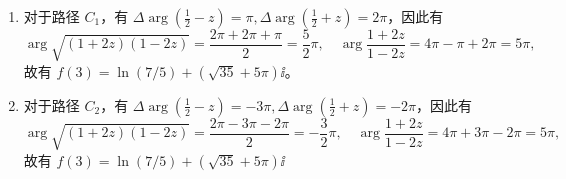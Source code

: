 \begin{question}
\begin{solution}
\begin{enumerate}
  \item 对于路径 \(C_1\)，有 \(\Delta \arg (\frac12-z)=\pi, \Delta \arg(\frac12+z)=2\pi\)，因此有 \[
\arg \sqrt{(1+2z)(1-2z)}=\frac{2\pi +2\pi + \pi}{2}= \frac52 \pi,
\quad \arg\frac{1+2z}{1-2z}=4\pi-\pi+2\pi=5\pi,
\] 故有 \(f(3)=\ln(7/5)+(\sqrt{35} + 5\pi) \ii\)。

  \item 对于路径 \(C_2\)，有 \(\Delta \arg(\frac12-z)=-3\pi, \Delta \arg(\frac12+z)=-2\pi\)，因此有 \[
\arg \sqrt{(1+2z)(1-2z)}=\frac{2\pi-3\pi-2\pi}{2}=-\frac32\pi,
\quad \arg\frac{1+2z}{1-2z}=4\pi+3\pi-2\pi=5\pi,
\] 故有 \(f(3)=\ln(7/5)+(\sqrt{35}+5\pi)\ii\)
\end{enumerate}
\end{solution}
\end{question}
